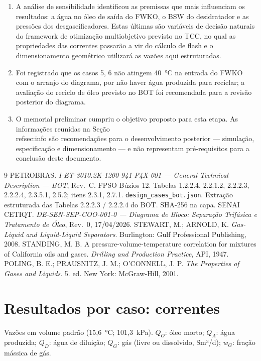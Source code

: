 \documentclass[11pt,a4paper]{article}
\numberwithin{equation}{section}
\numberwithin{table}{section}
\numberwithin{figure}{section}
\begin{document}
\begin{enumerate}
\item A análise de sensibilidade identificou as premissas que mais influenciam os resultados: a água no óleo de saída do FWKO, o BSW do desidratador e as pressões dos desgaseificadores. Estas últimas são variáveis de decisão naturais do framework de otimização multiobjetivo previsto no TCC, no qual as propriedades das correntes passarão a vir do cálculo de flash e o dimensionamento geométrico utilizará as vazões aqui estruturadas.
\item Foi registrado que os casos 5, 6 não atingem 40~\si{\celsius} na entrada do FWKO com o arranjo do diagrama, por não haver água produzida para reciclar; a avaliação do reciclo de óleo previsto no BOT foi recomendada para a revisão posterior do diagrama.
\item O memorial preliminar cumpriu o objetivo proposto para esta etapa. As informações reunidas na Seção~\\ref{sec:info} são recomendações para o desenvolvimento posterior --- simulação, especificação e dimensionamento --- e não representam pré-requisitos para a conclusão deste documento.
\end{enumerate}

\begin{thebibliography}{9}
 PETROBRAS. \emph{I-ET-3010.2K-1200-941-P4X-001 --- General Technical Description --- BOT}, Rev.~C. FPSO Búzios 12. Tabelas 1.2.2.4, 2.2.1.2, 2.2.2.3, 2.2.2.4, 2.3.5.1, 2.5.2; itens 2.3.1, 2.7.1.
 \texttt{design\_cases\_bot.json}. Extração estruturada das Tabelas 2.2.2.3 / 2.2.2.4 do BOT. SHA-256 na capa.
 SENAI CETIQT. \emph{DE-SEN-SEP-COO-001-0 --- Diagrama de Bloco: Separação Trifásica e Tratamento de Óleo}, Rev.~0, 17/04/2026.
 STEWART, M.; ARNOLD, K. \emph{Gas-Liquid and Liquid-Liquid Separators}. Burlington: Gulf Professional Publishing, 2008.
 STANDING, M. B. A pressure-volume-temperature correlation for mixtures of California oils and gases. \emph{Drilling and Production Practice}, API, 1947.
 POLING, B. E.; PRAUSNITZ, J. M.; O'CONNELL, J. P. \emph{The Properties of Gases and Liquids}. 5. ed. New York: McGraw-Hill, 2001.
\end{thebibliography}

\appendix
\clearpage
\section{Resultados por caso: correntes}\label{app:correntes}
Vazões em volume padrão (15,6~\si{\celsius}; 101,3~\si{\kilo\pascal}). $Q_O$: óleo morto; $Q_A$: água produzida; $Q_D$: água de diluição; $Q_G$: gás (livre ou dissolvido, Sm³/d); $w_G$: fração mássica de gás.
\end{document}
